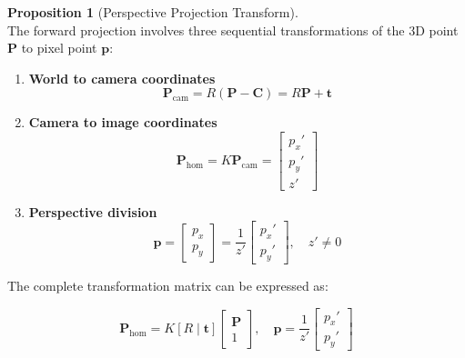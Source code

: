 \documentclass[12pt]{article}
\newcommand{\vect}[1]{\bm{#1}}
\theoremstyle{definition}
\newtheorem{proposition}{Proposition}[subsection]
\begin{document}
\begin{proposition}[Perspective Projection Transform] \label{prop:projection_pipeline} ~\\
The forward projection involves three sequential transformations of the 3D point $\vect{P}$ to pixel point $\vect{p}$:
\begin{enumerate}[label=\textbf{Step \arabic*:}]
    \item \textbf{World to camera coordinates}
    \begin{equation}
        \vect{P}_{\text{cam}} = R (\vect{P} - \vect{C}) = R \vect{P} + \vect{t}
    \end{equation}
    
    \item \textbf{Camera to image coordinates}
    \begin{equation}
        \vect{P}_{\text{hom}} = K \vect{P}_{\text{cam}} = \begin{bmatrix} p_x' \\ p_y' \\ z' \end{bmatrix}
    \end{equation}
    
    \item \textbf{Perspective division}
    \begin{equation}
        \vect{p} = \begin{bmatrix} p_x \\ p_y \end{bmatrix} = \frac{1}{z'} \begin{bmatrix} p_x' \\ p_y' \end{bmatrix}, \quad z' \neq 0
    \end{equation}
\end{enumerate}
\end{proposition}

The complete transformation matrix can be expressed as:

\vspace{0.5em}
\begin{equation}
\boxed{\vect{P}_{\text{hom}} = K [R \mid \vect{t}] \begin{bmatrix} \vect{P} \\ 1 \end{bmatrix} , \quad \vect{p} = \frac{1}{z'} \begin{bmatrix} p_x' \\ p_y' \end{bmatrix}} \label{eq:forward}
\end{equation}
\vspace{0.5em}
\end{document}
